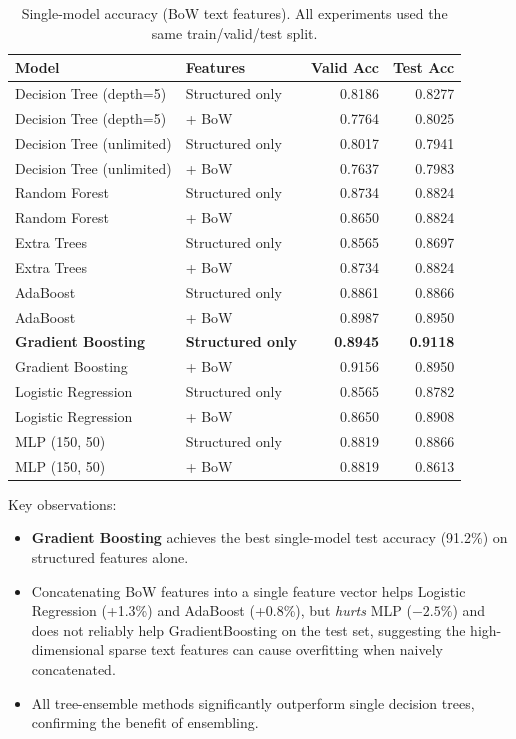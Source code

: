\documentclass[11pt,letterpaper]{article}
\begin{document}
\begin{table}[H]
\centering
\caption{Single-model accuracy (BoW text features). All experiments used the same
train/valid/test split.}
\label{tab:single}
\begin{tabular}{llrr}
\toprule
\textbf{Model} & \textbf{Features} & \textbf{Valid Acc} & \textbf{Test Acc}\\
\midrule
Decision Tree (depth=5)   & Structured only & 0.8186 & 0.8277 \\
Decision Tree (depth=5)   & + BoW            & 0.7764 & 0.8025 \\
Decision Tree (unlimited) & Structured only & 0.8017 & 0.7941 \\
Decision Tree (unlimited) & + BoW            & 0.7637 & 0.7983 \\
\midrule
Random Forest             & Structured only & 0.8734 & 0.8824 \\
Random Forest             & + BoW            & 0.8650 & 0.8824 \\
Extra Trees               & Structured only & 0.8565 & 0.8697 \\
Extra Trees               & + BoW            & 0.8734 & 0.8824 \\
AdaBoost                  & Structured only & 0.8861 & 0.8866 \\
AdaBoost                  & + BoW            & 0.8987 & 0.8950 \\
\textbf{Gradient Boosting}& \textbf{Structured only} & \textbf{0.8945} & \textbf{0.9118}\\
Gradient Boosting         & + BoW            & 0.9156 & 0.8950 \\
\midrule
Logistic Regression       & Structured only & 0.8565 & 0.8782 \\
Logistic Regression       & + BoW            & 0.8650 & 0.8908 \\
\midrule
MLP (150, 50)             & Structured only & 0.8819 & 0.8866 \\
MLP (150, 50)             & + BoW            & 0.8819 & 0.8613 \\
\bottomrule
\end{tabular}
\end{table}

\noindent Key observations:
\begin{itemize}
  \item \textbf{Gradient Boosting} achieves the best single-model test accuracy
        (91.2\%) on structured features alone.
  \item Concatenating BoW features into a single feature vector helps Logistic
        Regression (+1.3\%) and AdaBoost (+0.8\%), but \emph{hurts} MLP ($-2.5\%$)
        and does not reliably help GradientBoosting on the test set, suggesting the
        high-dimensional sparse text features can cause overfitting when naively
        concatenated.
  \item All tree-ensemble methods significantly outperform single decision trees,
        confirming the benefit of ensembling.
\end{itemize}
\end{document}

